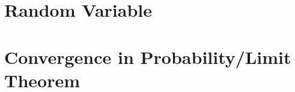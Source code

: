 \documentclass[11pt,fleqn]{book} %
\begin{document}







\chapter{Random Variable}




\chapter{Convergence in Probability/Limit Theorem}


\end{document}
